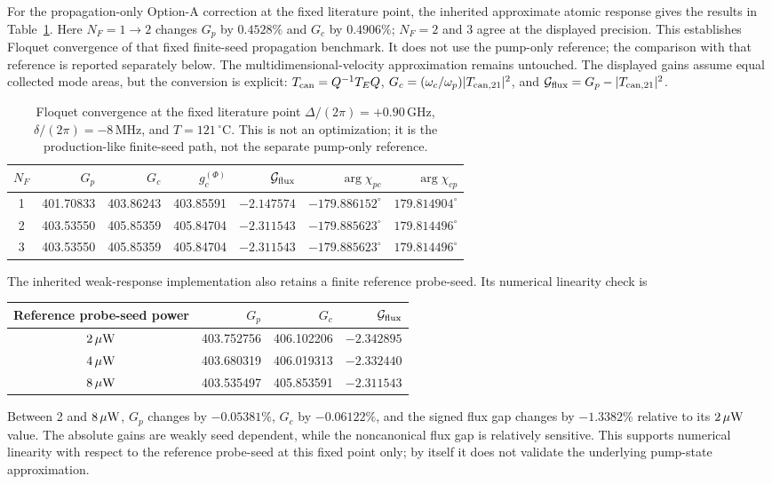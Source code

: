 \documentclass[11pt,a4paper]{article}
\newcommand{\GHz}{\,\mathrm{GHz}}
\newcommand{\MHz}{\,\mathrm{MHz}}
\newcommand{\degC}{\,^{\circ}\mathrm C}
\begin{document}
For the propagation-only Option-A correction at the fixed literature point,
the inherited approximate atomic response gives the results in
Table~\ref{tab:floquet-option-a}. Here $N_F=1\to2$ changes $G_p$ by
$0.4528\%$ and $G_c$ by $0.4906\%$; $N_F=2$ and 3 agree at the displayed
precision. This establishes Floquet convergence of that fixed finite-seed
propagation benchmark. It does not use the pump-only reference; the comparison
with that reference is reported separately below. The multidimensional-velocity
approximation remains untouched. The displayed gains assume equal collected mode
areas, but the conversion is explicit:
$T_{\rm can}=Q^{-1}T_EQ$, $G_c=(\omega_c/\omega_p)|T_{{\rm can},21}|^2$, and
$\mathcal G_{\rm flux}=G_p-|T_{{\rm can},21}|^2$.
\begin{table}[ht]
\centering
\caption{Floquet convergence at the fixed literature point
$\Delta/(2\pi)=+0.90\GHz$, $\delta/(2\pi)=-8\MHz$, and $T=121\degC$.
This is not an optimization; it is the production-like finite-seed path, not
the separate pump-only reference.}
\label{tab:floquet-option-a}
\small
\begin{tabular}{c r r r r r r}
\toprule
$N_F$ & $G_p$ & $G_c$ & $g_c^{(\Phi)}$ & $\mathcal G_{\rm flux}$ &
$\arg\chi_{pc}$ & $\arg\chi_{cp}$\\
\midrule
1 & 401.70833 & 403.86243 & 403.85591 & $-2.147574$ &
$-179.886152^\circ$ & $179.814904^\circ$\\
2 & 403.53550 & 405.85359 & 405.84704 & $-2.311543$ &
$-179.885623^\circ$ & $179.814496^\circ$\\
3 & 403.53550 & 405.85359 & 405.84704 & $-2.311543$ &
$-179.885623^\circ$ & $179.814496^\circ$\\
\bottomrule
\end{tabular}
\end{table}

The inherited weak-response implementation also retains a finite reference
probe-seed. Its numerical linearity check is
\begin{center}
\begin{tabular}{c r r r}
\toprule
Reference probe-seed power & $G_p$ & $G_c$ & $\mathcal G_{\rm flux}$\\
\midrule
$2\,\mu{\rm W}$ & 403.752756 & 406.102206 & $-2.342895$\\
$4\,\mu{\rm W}$ & 403.680319 & 406.019313 & $-2.332440$\\
$8\,\mu{\rm W}$ & 403.535497 & 405.853591 & $-2.311543$\\
\bottomrule
\end{tabular}
\end{center}
Between 2 and $8\,\mu{\rm W}$, $G_p$ changes by $-0.05381\%$, $G_c$ by
$-0.06122\%$, and the signed flux gap changes by $-1.3382\%$ relative to its
$2\,\mu{\rm W}$ value. The absolute gains are weakly seed dependent, while
the noncanonical flux gap is relatively sensitive. This supports numerical
linearity with respect to the reference probe-seed at this fixed point only;
by itself it does not validate the underlying pump-state approximation.
\end{document}
